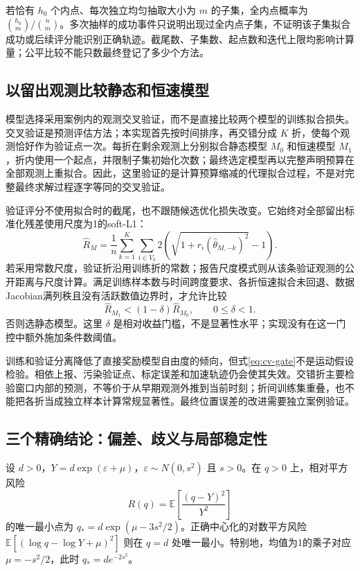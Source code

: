 若恰有 $h_0$ 个内点、每次独立均匀抽取大小为 $m$ 的子集，全内点概率为 $\binom{h_0}{m}/\binom{n}{m}$。多次抽样的成功事件只说明出现过全内点子集，不证明该子集拟合成功或后续评分能识别正确轨迹。截尾数、子集数、起点数和迭代上限均影响计算量；公平比较不能只数最终登记了多少个方法。

\subsection{以留出观测比较静态和恒速模型}

模型选择采用案例内的观测交叉验证，而不是直接比较两个模型的训练拟合损失。交叉验证是预测评估方法\cite{stone1974crossvalidatory}；本实现首先按时间排序，再交错分成 $K$ 折，使每个观测恰好作为验证点一次。每折在剩余观测上分别拟合静态模型 $M_0$ 和恒速模型 $M_1$，折内使用一个起点，并限制子集初始化次数；最终选定模型再以完整声明预算在全部观测上重拟合。因此，这里验证的是计算预算缩减的代理拟合过程，不是对完整最终求解过程逐字等同的交叉验证。

验证评分不使用拟合时的截尾，也不跟随候选优化损失改变。它始终对全部留出标准化残差使用尺度为1的soft-L1：
\begin{equation}
 \widehat R_M=\frac1n\sum_{k=1}^{K}\sum_{i\in V_k}
 2\left(\sqrt{1+r_i(\widehat\theta_{M,-k})^2}-1\right).
 \label{eq:cv-score}
\end{equation}
若采用常数尺度，验证折沿用训练折的常数；报告尺度模式则从该条验证观测的公开距离与尺度计算。满足训练样本数与时间跨度要求、各折恒速拟合未回退、数据Jacobian满列秩且没有活跃数值边界时，才允许比较
\begin{equation}
 \widehat R_{M_1}<(1-\delta)\widehat R_{M_0},
 \qquad 0\leq\delta<1.
 \label{eq:cv-gate}
\end{equation}
否则选静态模型。这里 $\delta$ 是相对收益门槛，不是显著性水平；实现没有在这一门控中额外施加条件数阈值。

训练和验证分离降低了直接奖励模型自由度的倾向，但式\eqref{eq:cv-gate}不是运动假设检验。相依上报、污染验证点、标定误差和加速轨迹仍会使其失效。交错折主要检验窗口内部的预测，不等价于从早期观测外推到当前时刻；折间训练集重叠，也不能把各折当成独立样本计算常规显著性。最终位置误差的改进需要独立案例验证。

\subsection{三个精确结论：偏差、歧义与局部稳定性}

\begin{proposition}[由观测自身决定尺度的标量偏差]
\label{prop:self-weight-bias}
设 $d>0$，$Y=d\exp(\varepsilon+\mu)$，$\varepsilon\sim N(0,s^2)$ 且 $s>0$。在 $q>0$ 上，相对平方风险
\begin{equation}
 R(q)=\mathbb E\left[\frac{(q-Y)^2}{Y^2}\right]
\end{equation}
的唯一最小点为 $q_*=d\exp(\mu-3s^2/2)$。正确中心化的对数平方风险 $\mathbb E[(\log q-\log Y+\mu)^2]$ 则在 $q=d$ 处唯一最小。特别地，均值为1的乘子对应 $\mu=-s^2/2$，此时 $q_*=d e^{-2s^2}$。
\end{proposition}

